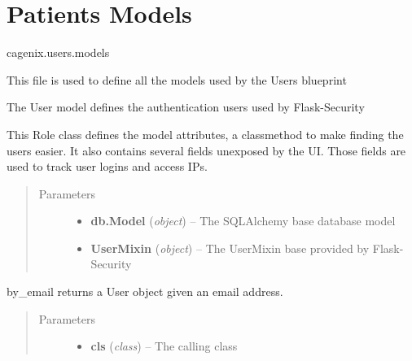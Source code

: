 \documentclass[letterpaper,10pt,english]{sphinxmanual}
\begin{document}
\section{Patients Models}
\label{dev-patients:patients-models-label}\label{dev-patients:patients-models}\label{dev-patients:module-cagenix.patients.models}
cagenix.users.models

This file is used to define all the models used by the Users blueprint

\begin{fulllineitems}
\label{dev-patients:cagenix.patients.models.Patient}
The User model defines the authentication users used by Flask-Security

This Role class defines the model attributes, a classmethod to make finding
the users easier. It also contains several fields unexposed by the UI. Those
fields are used to track user logins and access IPs.
\begin{quote}\begin{description}
\item[{Parameters}] \leavevmode\begin{itemize}
\item {} 
\textbf{db.Model} (\emph{object}) -- The SQLAlchemy base database model

\item {} 
\textbf{UserMixin} (\emph{object}) -- The UserMixin base provided by Flask-Security

\end{itemize}

\end{description}\end{quote}

\begin{fulllineitems}
\label{dev-patients:cagenix.patients.models.Patient.by_email}
by\_email returns a User object given an email address.
\begin{quote}\begin{description}
\item[{Parameters}] \leavevmode\begin{itemize}
\item {} 
\textbf{cls} (\emph{class}) -- The calling class


\end{itemize}
\end{description}
\end{quote}
\end{fulllineitems}
\end{fulllineitems}
\end{document}
